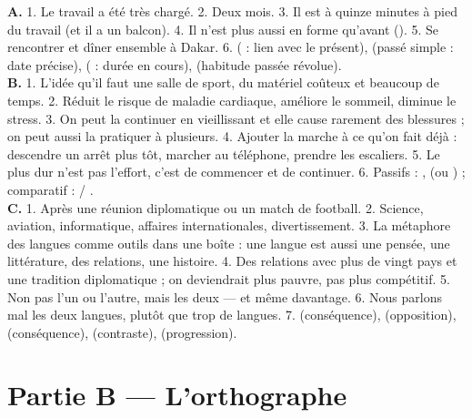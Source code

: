 \begin{corrige}[Textes A, B, C]
\textbf{A.} 1. Le travail a été très chargé. 2. Deux mois. 3. Il est à quinze minutes à pied
du travail (et il a un balcon). 4. Il n'est plus aussi en forme qu'avant (). 5. Se rencontrer et dîner ensemble à Dakar. 6. 
( : lien avec le présent),  (passé simple : date précise),
 ( : durée en cours),
 (habitude passée révolue).\\[4pt]
\textbf{B.} 1. L'idée qu'il faut une salle de sport, du matériel coûteux et beaucoup de temps.
2. Réduit le risque de maladie cardiaque, améliore le sommeil, diminue le stress.
3. On peut la continuer en vieillissant et elle cause rarement des blessures ; on peut aussi
la pratiquer à plusieurs. 4. Ajouter la marche à ce qu'on fait déjà : descendre un arrêt plus
tôt, marcher au téléphone, prendre les escaliers. 5. Le plus dur n'est pas l'effort, c'est de
commencer et de continuer. 6. Passifs : ,  (ou ) ; comparatif :  /
.\\[4pt]
\textbf{C.} 1. Après une réunion diplomatique ou un match de football. 2. Science, aviation,
informatique, affaires internationales, divertissement. 3. La métaphore des langues comme
outils dans une boîte : une langue est aussi une pensée, une littérature, des relations, une
histoire. 4. Des relations avec plus de vingt pays et une tradition diplomatique ; on
deviendrait plus pauvre, pas plus compétitif. 5. Non pas l'un ou l'autre, mais les deux ---
et même davantage. 6. Nous parlons mal les deux langues, plutôt que trop de langues.
7.  (conséquence),  (opposition),  (conséquence),
 (contraste),  (progression).
\end{corrige}


\section{Partie B --- L'orthographe}

